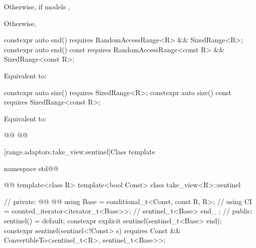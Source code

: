 {\begin{itemdescr}
\begin{itemize}
{\item Otherwise, if  models ,

\item Otherwise,
} %
\end{itemize}
\end{itemdescr}

{\color{oldclr}
%
\begin{itemdecl}
constexpr auto end() requires RandomAccessRange<R> && SizedRange<R>;
constexpr auto end() const
  requires RandomAccessRange<const R> && SizedRange<const R>;
\end{itemdecl}

\begin{itemdescr}
\pnum
\effects Equivalent to: 
\end{itemdescr}
} %

%
\begin{itemdecl}
constexpr auto size() requires SizedRange<R>;
constexpr auto size() const requires SizedRange<const R>;
\end{itemdecl}

\begin{itemdescr}
\pnum
\effects Equivalent to:
\begin{codeblock}
@@
@@
\end{codeblock}
\end{itemdescr}

[range.adaptors.take_view.sentinel]{Class template }

\pnum
{}

\begin{codeblock}
namespace std@@ { @@
  template<class R>
  template<bool Const>
  class take_view<R>::sentinel { // \expos
  private:
    @@
      @@
    using Base = conditional_t<Const, const R, R>; // \expos
    using CI = counted_iterator<iterator_t<Base>>; // \expos
    sentinel_t<Base> end_ {};                      // \expos
  public:
    sentinel() = default;
    constexpr explicit sentinel(sentinel_t<Base> end);
    constexpr sentinel(sentinel<!Const> s)
      requires Const && ConvertibleTo<sentinel_t<R>, sentinel_t<Base>>;

}}
\end{codeblock}}
